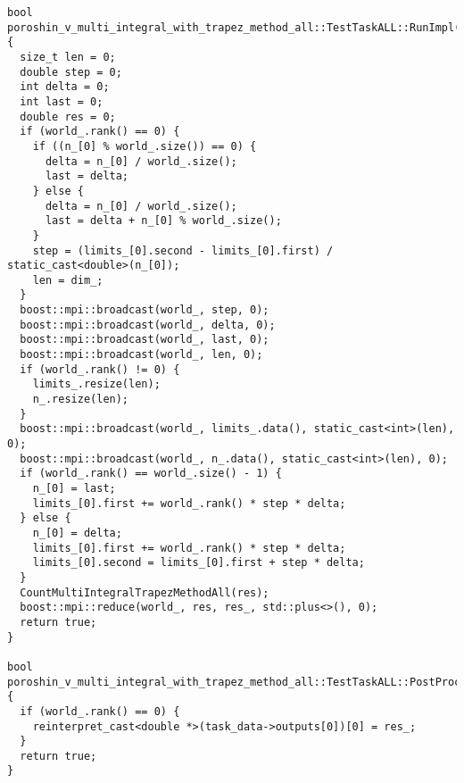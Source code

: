 \documentclass[12pt]{article}
\begin{document}
\begin{lstlisting}
bool poroshin_v_multi_integral_with_trapez_method_all::TestTaskALL::RunImpl() {
  size_t len = 0;
  double step = 0;
  int delta = 0;
  int last = 0;
  double res = 0;
  if (world_.rank() == 0) {
    if ((n_[0] % world_.size()) == 0) {
      delta = n_[0] / world_.size();
      last = delta;
    } else {
      delta = n_[0] / world_.size();
      last = delta + n_[0] % world_.size();
    }
    step = (limits_[0].second - limits_[0].first) / static_cast<double>(n_[0]);
    len = dim_;
  }
  boost::mpi::broadcast(world_, step, 0);
  boost::mpi::broadcast(world_, delta, 0);
  boost::mpi::broadcast(world_, last, 0);
  boost::mpi::broadcast(world_, len, 0);
  if (world_.rank() != 0) {
    limits_.resize(len);
    n_.resize(len);
  }
  boost::mpi::broadcast(world_, limits_.data(), static_cast<int>(len), 0);
  boost::mpi::broadcast(world_, n_.data(), static_cast<int>(len), 0);
  if (world_.rank() == world_.size() - 1) {
    n_[0] = last;
    limits_[0].first += world_.rank() * step * delta;
  } else {
    n_[0] = delta;
    limits_[0].first += world_.rank() * step * delta;
    limits_[0].second = limits_[0].first + step * delta;
  }
  CountMultiIntegralTrapezMethodAll(res);
  boost::mpi::reduce(world_, res, res_, std::plus<>(), 0);
  return true;
}

bool poroshin_v_multi_integral_with_trapez_method_all::TestTaskALL::PostProcessingImpl() {
  if (world_.rank() == 0) {
    reinterpret_cast<double *>(task_data->outputs[0])[0] = res_;
  }
  return true;
}
\end{lstlisting}
\end{document}
